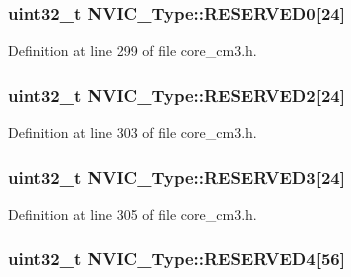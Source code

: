 \subsubsection[{\texorpdfstring{R\+E\+S\+E\+R\+V\+E\+D0}{RESERVED0}}]{\setlength{\rightskip}{0pt plus 5cm}uint32\+\_\+t N\+V\+I\+C\+\_\+\+Type\+::\+R\+E\+S\+E\+R\+V\+E\+D0\mbox{[}24\mbox{]}}\hypertarget{structNVIC__Type_a2de17698945ea49abd58a2d45bdc9c80}{}\label{structNVIC__Type_a2de17698945ea49abd58a2d45bdc9c80}


Definition at line 299 of file core\+\_\+cm3.\+h.

\subsubsection[{\texorpdfstring{R\+E\+S\+E\+R\+V\+E\+D2}{RESERVED2}}]{\setlength{\rightskip}{0pt plus 5cm}uint32\+\_\+t N\+V\+I\+C\+\_\+\+Type\+::\+R\+E\+S\+E\+R\+V\+E\+D2\mbox{[}24\mbox{]}}\hypertarget{structNVIC__Type_a0953af43af8ec7fd5869a1d826ce5b72}{}\label{structNVIC__Type_a0953af43af8ec7fd5869a1d826ce5b72}


Definition at line 303 of file core\+\_\+cm3.\+h.

\subsubsection[{\texorpdfstring{R\+E\+S\+E\+R\+V\+E\+D3}{RESERVED3}}]{\setlength{\rightskip}{0pt plus 5cm}uint32\+\_\+t N\+V\+I\+C\+\_\+\+Type\+::\+R\+E\+S\+E\+R\+V\+E\+D3\mbox{[}24\mbox{]}}\hypertarget{structNVIC__Type_a9dd330835dbf21471e7b5be8692d77ab}{}\label{structNVIC__Type_a9dd330835dbf21471e7b5be8692d77ab}


Definition at line 305 of file core\+\_\+cm3.\+h.

\subsubsection[{\texorpdfstring{R\+E\+S\+E\+R\+V\+E\+D4}{RESERVED4}}]{\setlength{\rightskip}{0pt plus 5cm}uint32\+\_\+t N\+V\+I\+C\+\_\+\+Type\+::\+R\+E\+S\+E\+R\+V\+E\+D4\mbox{[}56\mbox{]}}\hypertarget{structNVIC__Type_a5c0e5d507ac3c1bd5cdaaf9bbd177790}{}\label{structNVIC__Type_a5c0e5d507ac3c1bd5cdaaf9bbd177790}


